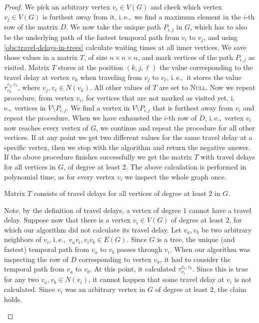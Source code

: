 \documentclass[a4paper,UKenglish,cleveref, autoref, thm-restate]{lipics-v2021}
\newcommand{\ie}{i.\,e.,\ }
\begin{document}
\begin{proof}
    We pick an arbitrary vertex $v_i \in V(G)$ and check which vertex $v_j \in V(G)$ is furthest away from it, \ie we find a maximum element in the $i$-th row of the matrix $D$.
    We now take the unique path $P_{i,j}$ in $G$, 
    which has to also be the underlying path of the fastest temporal path from $v_i$ to $v_j$, and using \cref{obs:travel-delays-in-trees} calculate waiting times at all inner vertices.
    We save those values in a matrix $T$, of size $n \times n \times n$, and mark vertices of the path  $P_{i,j}$ as visited.
    Matrix $T$ stores at the position $(k,j,\ell)$ the value corresponding to the travel delay at vertex $v_k$ when traveling from $v_{j}$ to $v_{\ell}$, 
    \ie it stores the value $\tau_{v_k}^{v_{j}, v_\ell}$, where $v_j,v_\ell \in N(v_k)$. All other values of $T$ are set to \textsc{Null}.
    Now we repeat procedure, from vertex $v_i$, for vertices that are not marked as visited yet, \ie vertices in $V \setminus P_{i,j}$.
    We find a vertex in $V \setminus P_{i,j}$ that is furthest away from $v_i$ and repeat the procedure.
    When we have exhausted the $i$-th row of $D$,
    \ie vertex $v_i$ now reaches every vertex of $G$,
    we continue and repeat the procedure for all other vertices.
    If at any point we get two different values for the same travel delay at a specific vertex, then we stop with the algorithm and return the negative answer.
    If the above procedure finishes successfully we get the matrix $T$ with travel delays for all vertices in $G$, of degree at least $2$.
    The above calculation is performed in polynomial time, as for every vertex $v_i$ we inspect the whole graph once.
    \begin{claim}\label{lemma:matrixT-travelDelays-tree}
        Matrix $T$ consists of travel delays for all vertices of degree at least $2$ in $G$.
    \end{claim}
    \begin{claimproof}
        Note, by the definition of travel delays, a vertex of degree $1$ cannot have a travel delay.
        Suppose now that there is a vertex $v_i \in V(G)$ of degree at least $2$, for which our algorithm did not calculate its travel delay.
        Let $v_a, v_b$ be two arbitrary neighbors of $v_i$, \ie $v_a v_i, v_i v_b \in E(G)$.
        Since $G$ is a tree, the unique (and fastest) temporal path from $v_a$ to $v_b$ passes through $v_i$.
        When our algorithm was inspecting the row of $D$ corresponding to vertex $v_a$, it had to consider the temporal path from $v_a$ to $v_b$. 
        At this point, it calculated $\tau_{v_i}^{v_a,v_b}$. 
        Since this is true for any two $v_a, v_b \in N(v_i)$, it cannot happen that some travel delay at $v_i$ is not calculated.
        Since $v_i$ was an arbitrary vertex in $G$ of degree at least $2$, the claim holds.
    \end{claimproof}
    

\end{proof}
\end{document}
